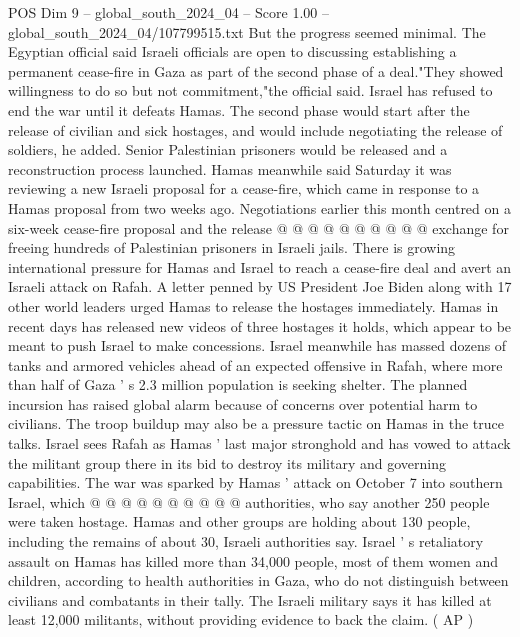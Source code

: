 \begin{textsample}{POS Dim 9 – global\_south\_2024\_04 – Score 1.00 – global\_south\_2024\_04/107799515.txt}
But the progress seemed minimal.
The Egyptian official said Israeli officials are open to discussing establishing a permanent cease-fire in Gaza as part of the second phase of a deal."They showed willingness to do so but not commitment,"the official said.
Israel has refused to end the war until it defeats Hamas.
The second phase would start after the release of civilian and sick hostages, and would include negotiating the release of soldiers, he added.
Senior Palestinian prisoners would be released and a reconstruction process launched.
Hamas meanwhile said Saturday it was reviewing a new Israeli proposal for a cease-fire, which came in response to a Hamas proposal from two weeks ago.
Negotiations earlier this month centred on a six-week cease-fire proposal and the release @ @ @ @ @ @ @ @ @ @ exchange for freeing hundreds of Palestinian prisoners in Israeli jails.
There is growing international pressure for Hamas and Israel to reach a cease-fire deal and avert an Israeli attack on Rafah.
A letter penned by US President Joe Biden along with 17 other world leaders urged Hamas to release the hostages immediately.
Hamas in recent days has released new videos of three hostages it holds, which appear to be meant to push Israel to make concessions.
Israel meanwhile has massed dozens of tanks and armored vehicles ahead of an expected offensive in Rafah, where more than half of Gaza ' s 2.3 million population is seeking shelter.
The planned incursion has raised global alarm because of concerns over potential harm to civilians.
The troop buildup may also be a pressure tactic on Hamas in the truce talks.
Israel sees Rafah as Hamas ' last major stronghold and has vowed to attack the militant group there in its bid to destroy its military and governing capabilities.
The war was sparked by Hamas ' attack on October 7 into southern Israel, which @ @ @ @ @ @ @ @ @ @ authorities, who say another 250 people were taken hostage.
Hamas and other groups are holding about 130 people, including the remains of about 30, Israeli authorities say.
Israel ' s retaliatory assault on Hamas has killed more than 34,000 people, most of them women and children, according to health authorities in Gaza, who do not distinguish between civilians and combatants in their tally.
The Israeli military says it has killed at least 12,000 militants, without providing evidence to back the claim. ( AP )

\end{textsample}
